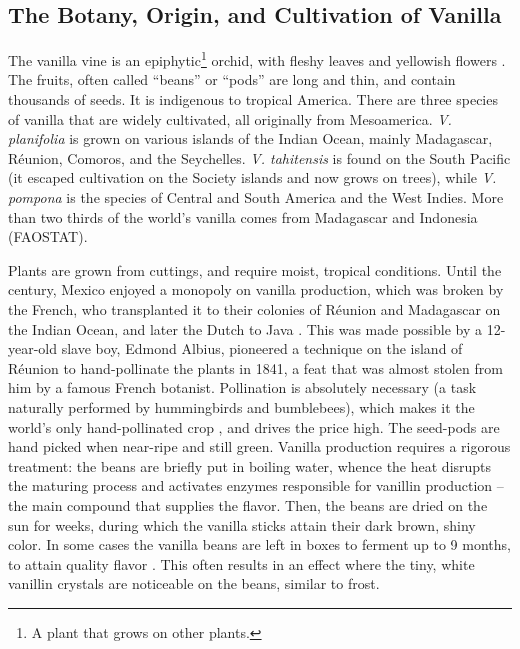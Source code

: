 \subsection{The Botany, Origin, and Cultivation of Vanilla }

The vanilla vine is an epiphytic\footnote{A plant that grows on other plants.} orchid,  with fleshy leaves and yellowish flowers \autocite[282]{van_wyk_culinary_2014}. 
The fruits, often called ``beans'' or ``pods'' are long and thin, and contain thousands of seeds. It is indigenous to tropical America. There are three species of vanilla that are widely cultivated, all  originally from Mesoamerica. \textit{V. planifolia} is grown on various islands of the Indian Ocean, mainly Madagascar, Réunion, Comoros, and the Seychelles. \textit{V. tahitensis} is found on the South Pacific (it escaped cultivation on the Society islands and now grows on trees), while \textit{V. pompona} is the species of Central and South America and the West Indies. More than two thirds of the world's vanilla comes from Madagascar and Indonesia (FAOSTAT).

Plants are grown from cuttings, and require moist, tropical conditions. Until the  century, Mexico enjoyed a monopoly on vanilla production, which was broken by the French, who transplanted it to their colonies of Réunion and Madagascar on the Indian Ocean, and later the Dutch to Java \autocite[282]{van_wyk_culinary_2014}.
This was made possible by a 12-year-old slave boy, Edmond Albius, pioneered a technique on the island of Réunion to hand-pollinate the plants in 1841, a feat that was almost stolen from him by a famous French botanist. Pollination is absolutely necessary (a task naturally performed by hummingbirds and bumblebees), which makes it the world's only hand-pollinated crop \autocite[959]{mabberley_mabberleys_2017}, and drives the price high. The seed-pods are hand picked when near-ripe and still green. Vanilla production requires a rigorous treatment: the beans are briefly put in boiling water, whence the heat disrupts the maturing process and activates enzymes responsible for vanillin production -- the main compound that supplies the flavor. Then, the beans are dried on the sun for weeks, during which the vanilla sticks attain their dark brown, shiny color. In some cases the vanilla beans are left in boxes to ferment up to 9 months, to attain quality flavor \autocite[282]{van_wyk_culinary_2014}. This often results in an effect where the tiny, white vanillin crystals are noticeable on the beans, similar to frost.



